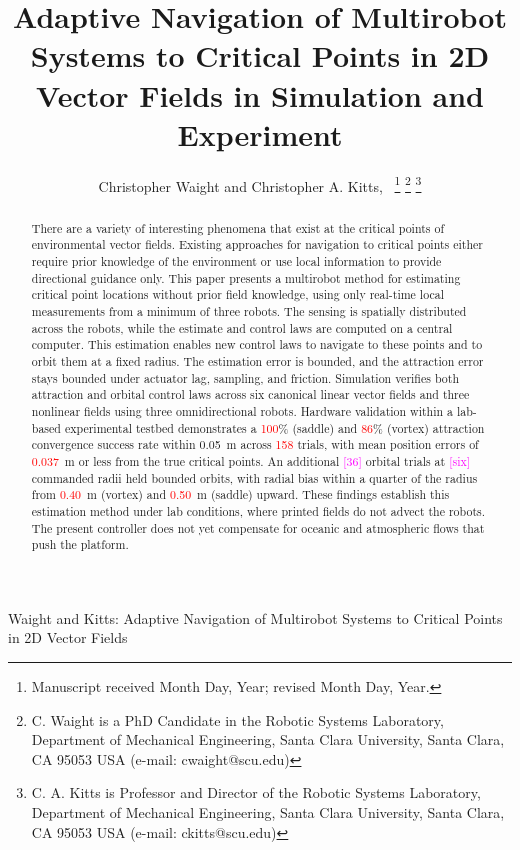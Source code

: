 \documentclass[lettersize,journal]{IEEEtran}
\newcommand{\syn}[1]{\textcolor{red}{#1}}            %
\newcommand{\open}[1]{\textcolor{magenta}{[#1]}}     %
\begin{document}
\title{Adaptive Navigation of Multirobot Systems to Critical Points in 2D Vector Fields in Simulation and Experiment}
\author{Christopher Waight and Christopher A. Kitts,~
\thanks{Manuscript received Month Day, Year; revised Month Day, Year.}
\thanks{C. Waight is a PhD Candidate in the Robotic Systems Laboratory, Department of Mechanical Engineering, Santa Clara University, Santa Clara, CA 95053 USA (e-mail: cwaight@scu.edu)}
\thanks{C. A. Kitts is Professor and Director of the Robotic Systems Laboratory, Department of Mechanical Engineering, Santa Clara University, Santa Clara, CA 95053 USA (e-mail: ckitts@scu.edu)}
}
%
{Waight and Kitts: Adaptive Navigation of Multirobot Systems to Critical Points in 2D Vector Fields}


\maketitle

\begin{abstract}
    There are a variety of interesting phenomena that exist at the critical points of environmental vector fields. Existing approaches for navigation to critical points either require prior knowledge of the environment or use local information to provide directional guidance only. This paper presents a multirobot method for estimating critical point locations without prior field knowledge, using only real-time local measurements from a minimum of three robots. The sensing is spatially distributed across the robots, while the estimate and control laws are computed on a central computer.
    This estimation enables new control laws to navigate to these points and to orbit them at a fixed radius.
    The estimation error is bounded, and the attraction error stays bounded under actuator lag, sampling, and friction.
    Simulation verifies both attraction and orbital control laws across six canonical linear vector fields and three nonlinear fields using three omnidirectional robots. Hardware validation within a lab-based experimental testbed demonstrates a \syn{100}\% (saddle) and \syn{86}\% (vortex) attraction convergence success rate within 0.05~m across \syn{158} trials, with mean position errors of \syn{0.037}~m or less from the true critical points. An additional \open{36} orbital trials at \open{six} commanded radii held bounded orbits, with radial bias within a quarter of the radius from \syn{0.40}~m (vortex) and \syn{0.50}~m (saddle) upward. %
    These findings establish this estimation method under lab conditions, where printed fields do not advect the robots. The present controller does not yet compensate for oceanic and atmospheric flows that push the platform.

\end{abstract}
\end{document}
